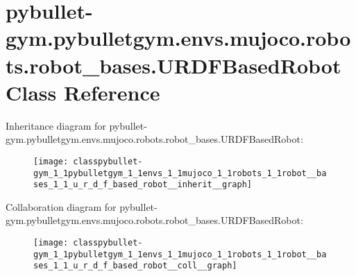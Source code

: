 \hypertarget{classpybullet-gym_1_1pybulletgym_1_1envs_1_1mujoco_1_1robots_1_1robot__bases_1_1_u_r_d_f_based_robot}{}\section{pybullet-\/gym.pybulletgym.\+envs.\+mujoco.\+robots.\+robot\+\_\+bases.\+U\+R\+D\+F\+Based\+Robot Class Reference}
\label{classpybullet-gym_1_1pybulletgym_1_1envs_1_1mujoco_1_1robots_1_1robot__bases_1_1_u_r_d_f_based_robot}


Inheritance diagram for pybullet-\/gym.pybulletgym.\+envs.\+mujoco.\+robots.\+robot\+\_\+bases.\+U\+R\+D\+F\+Based\+Robot\+:
\nopagebreak
\begin{figure}[H]
\begin{center}
\leavevmode
\texttt{[image: classpybullet-gym\_1\_1pybulletgym\_1\_1envs\_1\_1mujoco\_1\_1robots\_1\_1robot\_\_bases\_1\_1\_u\_r\_d\_f\_based\_robot\_\_inherit\_\_graph]}
\end{center}
\end{figure}


Collaboration diagram for pybullet-\/gym.pybulletgym.\+envs.\+mujoco.\+robots.\+robot\+\_\+bases.\+U\+R\+D\+F\+Based\+Robot\+:
\nopagebreak
\begin{figure}[H]
\begin{center}
\leavevmode
\texttt{[image: classpybullet-gym\_1\_1pybulletgym\_1\_1envs\_1\_1mujoco\_1\_1robots\_1\_1robot\_\_bases\_1\_1\_u\_r\_d\_f\_based\_robot\_\_coll\_\_graph]}
\end{center}
\end{figure}

